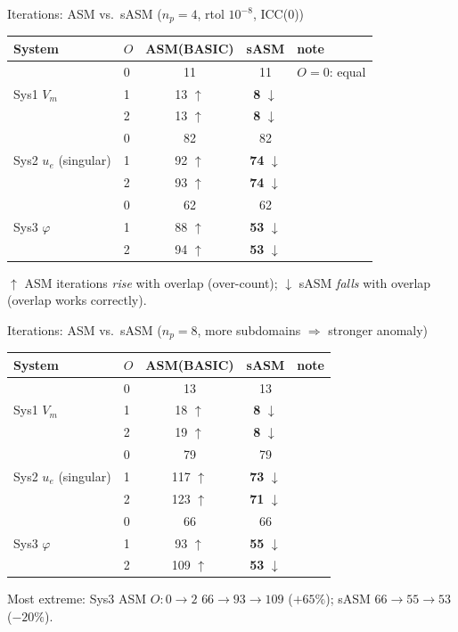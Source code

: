 \documentclass[aspectratio=169,11pt]{beamer}
\newcommand{\up}{\textcolor{bad}{$\uparrow$}}
\newcommand{\dn}{\textcolor{good}{$\downarrow$}}
\begin{document}
\begin{frame}{Iterations: ASM vs.\ sASM ($n_p{=}4$, rtol $10^{-8}$, ICC(0))}
\begin{table}\small
\begin{tabular}{@{}llccl@{}}
\toprule
System & $O$ & ASM(BASIC) & sASM & note \\
\midrule
\multirow{3}{*}{Sys1 $V_m$}
 & 0 & 11 & 11 & $O{=}0$: equal \\
 & 1 & 13 \up & \textbf{8} \dn & \\
 & 2 & 13 \up & \textbf{8} \dn & \\
\midrule
\multirow{3}{*}{Sys2 $u_e$ (singular)}
 & 0 & 82 & 82 & \\
 & 1 & 92 \up & \textbf{74} \dn & \\
 & 2 & 93 \up & \textbf{74} \dn & \\
\midrule
\multirow{3}{*}{Sys3 $\varphi$}
 & 0 & 62 & 62 & \\
 & 1 & 88 \up & \textbf{53} \dn & \\
 & 2 & 94 \up & \textbf{53} \dn & \\
\bottomrule
\end{tabular}
\end{table}
\vspace{-0.3em}
\footnotesize \textcolor{bad}{$\uparrow$ ASM iterations \emph{rise} with overlap} (over-count); \textcolor{good}{$\downarrow$ sASM \emph{falls}} with overlap (overlap works correctly).
\end{frame}

\begin{frame}{Iterations: ASM vs.\ sASM ($n_p{=}8$, more subdomains $\Rightarrow$ stronger anomaly)}
\begin{table}\small
\begin{tabular}{@{}llccl@{}}
\toprule
System & $O$ & ASM(BASIC) & sASM & note \\
\midrule
\multirow{3}{*}{Sys1 $V_m$}
 & 0 & 13 & 13 & \\
 & 1 & 18 \up & \textbf{8} \dn & \\
 & 2 & 19 \up & \textbf{8} \dn & \\
\midrule
\multirow{3}{*}{Sys2 $u_e$ (singular)}
 & 0 & 79 & 79 & \\
 & 1 & 117 \up & \textbf{73} \dn & \\
 & 2 & 123 \up & \textbf{71} \dn & \\
\midrule
\multirow{3}{*}{Sys3 $\varphi$}
 & 0 & 66 & 66 & \\
 & 1 & 93 \up & \textbf{55} \dn & \\
 & 2 & 109 \up & \textbf{53} \dn & \\
\bottomrule
\end{tabular}
\end{table}
\vspace{-0.3em}
\footnotesize Most extreme: Sys3 ASM $O{:}0{\to}2$ \textcolor{bad}{$66{\to}93{\to}109$ ($+65\%$)}; sASM \textcolor{good}{$66{\to}55{\to}53$ ($-20\%$)}.
\end{frame}
\end{document}
